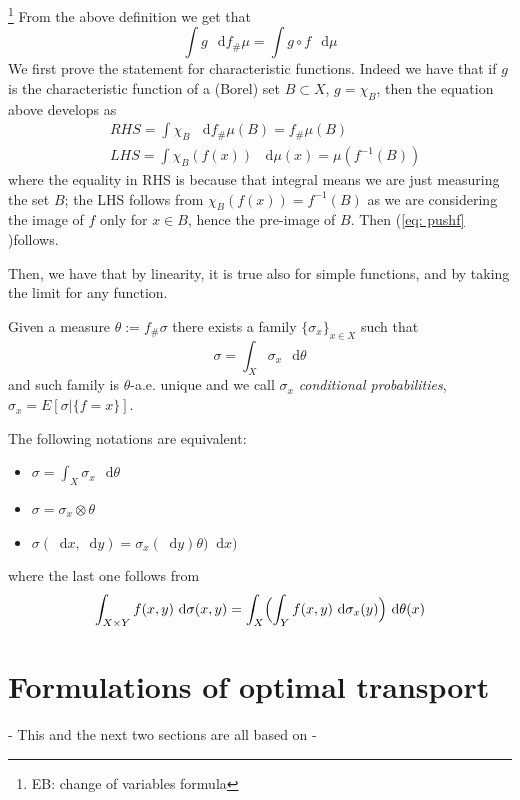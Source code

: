 \documentclass[a4paper,12pt,reqno]{amsbook}
\theoremstyle{definition} %
\newcommand*\de{\mathop{}\!\mathrm{d}}
\newcommand{\1}{\mathbbm{1}}
\theoremstyle{plain}
\theoremstyle{remark}
\begin{document}
\begin{proposition}\footnote{EB: change of variables formula} \label{prop: pushf}
    From the above definition we get that
\begin{equation*}
    \int g \, \de{f_\#\mu} = \int g \circ f \, \de{\mu}
\end{equation*}
We first prove the statement for characteristic functions. Indeed we have that if $g$ is the characteristic function of a (Borel) set $B\subset X$, $g=\chi_B$, then the equation above develops as
\begin{align*}
    &RHS=\int \chi_B \,\,\de{f_\#\mu(B)} = f_\#\mu(B)\\
    &LHS = \int \chi_B(f(x)) \,\, \de{\mu}(x) = \mu(f^{-1}(B))
\end{align*}
where the equality in RHS is because that integral means we are just measuring the set $B$; the LHS follows from $\chi_B(f(x)) = f^{-1}(B)$ as we are considering the image of $f$ only for $x\in B$, hence the pre-image of $B$. Then (\ref{eq: pushf} )follows.

Then, we have that by linearity, it is true also for simple functions, and by taking the limit for any function.
\end{proposition}

\begin{theorem}  \label{thm: sigmax}
Given a measure $\theta := f_\# \sigma$ there exists a family $\{\sigma_x\}_{x\in X}$ such that
\[
\sigma = \int_X \sigma_x \, \de{\theta}
\]
and such family is $\theta$-a.e. unique and we call $\sigma_x$ \textit{conditional probabilities}, $\sigma_x = E[\sigma | \{f=x\}]$. 

The following notations are equivalent:
\begin{itemize}
\item$\sigma = \int_X \sigma_x \, \de{\theta}$
    \item $\sigma = \sigma_x \otimes \theta$
    \item $\sigma (\de{x}, \de{y}) = \sigma_x (\de{y})\theta )\de{x}) $
    \end{itemize}
where the last one follows from
\[
\int_{X\times Y} f(x,y) \, \de{\sigma(x,y)} = \int_X\Bigl(\int_Y f(x,y) \, \de{\sigma_x(y)} \Big) \, \de{\theta(x)}
\]
    
\end{theorem}
\section{Formulations of optimal transport}
- This and the next two sections are all based on \cite{brue} -
\\
\end{document}
